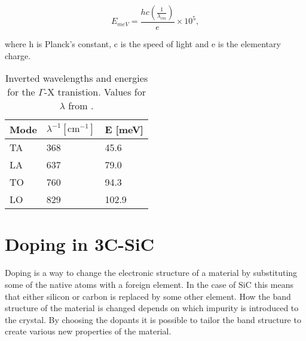 \[E_{meV} = \frac{hc(\frac{1}{\lambda_{cm}})}{e}\times 10^5,\]

\noindent where h is Planck's constant, c is the speed of light and e is the elementary charge. 

\begin{table}[h]
\caption{Inverted wavelengths and energies for the $\Gamma$-X tranistion. Values for $\lambda$ from \cite{Karch1994}.}
\label{tab:phonons}
\begin{center}
\begin{tabular}{ l l l }
  \hline                       
  \hline       
  \vspace{1mm}
    Mode  & $\lambda^{-1} [\mathrm{cm}^{-1}]$  & E [meV]\\
    \hline
  TA &  368 & 45.6\\
  LA &  637 & 79.0\\
  TO &  760 & 94.3\\
  LO &  829 & 102.9\\
  \hline  
\end{tabular}
\end{center}
\end{table}









\section{Doping in 3C-SiC}
\label{sec:doping_in_3C}

	


Doping is a way to change the electronic structure of a material by substituting some of the native atoms with a foreign element. In the case of SiC this means that either silicon or carbon is replaced by some other element. How the band structure of the material is changed depends on which impurity is introduced to the crystal. By choosing the dopants it is possible to tailor the band structure to create various new properties of the material. 

